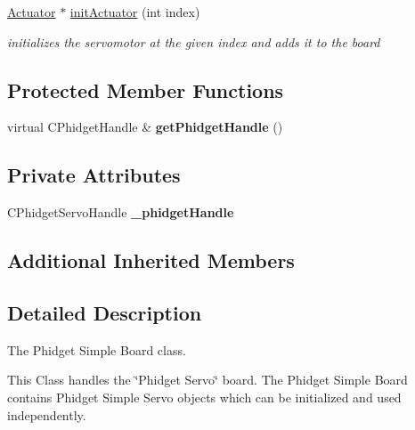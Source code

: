 \begin{DoxyCompactItemize}
\hyperlink{classdrobot_1_1device_1_1actuator_1_1Actuator}{Actuator} $\ast$ \hyperlink{classdrobot_1_1device_1_1actuator_1_1PhidgetSimpleBoard_a7ffef559394dd7d951e6bb9fd24c3bad}{init\-Actuator} (int index)
\begin{DoxyCompactList}\small\item\em initializes the servomotor at the given index and adds it to the board \end{DoxyCompactList}\end{DoxyCompactItemize}
\subsection*{Protected Member Functions}
\begin{DoxyCompactItemize}
\item 
\hypertarget{classdrobot_1_1device_1_1actuator_1_1PhidgetSimpleBoard_ae8305bb67f96e56805fc5a2dc917210a}{virtual C\-Phidget\-Handle \& {\bfseries get\-Phidget\-Handle} ()}\label{classdrobot_1_1device_1_1actuator_1_1PhidgetSimpleBoard_ae8305bb67f96e56805fc5a2dc917210a}

\end{DoxyCompactItemize}
\subsection*{Private Attributes}
\begin{DoxyCompactItemize}
\item 
\hypertarget{classdrobot_1_1device_1_1actuator_1_1PhidgetSimpleBoard_ac085270f4149d7f33e4992eaae8b7e60}{C\-Phidget\-Servo\-Handle {\bfseries \-\_\-phidget\-Handle}}\label{classdrobot_1_1device_1_1actuator_1_1PhidgetSimpleBoard_ac085270f4149d7f33e4992eaae8b7e60}

\end{DoxyCompactItemize}
\subsection*{Additional Inherited Members}


\subsection{Detailed Description}
The Phidget Simple Board class. 

This Class handles the \char`\"{}\-Phidget Servo\char`\"{} board. The Phidget Simple Board contains Phidget Simple Servo objects which can be initialized and used independently. 

